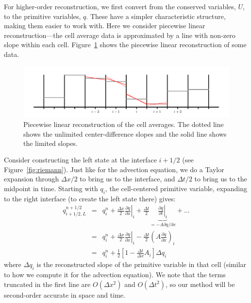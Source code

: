 \documentclass[11pt]{article}
\begin{document}
For higher-order reconstruction, we first convert from the conserved
variables, $U$, to the primitive variables, $q$.  These have a simpler
characteristic structure, making them easier to work with.  Here we
consider piecewise linear reconstruction---the cell average data is
approximated by a line with non-zero slope within each cell.
Figure~\ref{fig:plm} shows the piecewise linear reconstruction of some
data.

\begin{figure}[t]
\centering
\includegraphics[width=6.5in]{piecewise-linear}
\caption{\label{fig:plm} Piecewise linear reconstruction of the
cell averages.  The dotted line shows the unlimited center-difference
slopes and the solid line shows the limited slopes.}
\end{figure}

Consider constructing the left state at the interface $i+1/2$ (see
Figure~\ref{fig:riemann}).  Just like for the advection equation, we
do a Taylor expansion through $\Delta x/2$ to bring us to the
interface, and $\Delta t/2$ to bring us to the midpoint in time.
Starting with $q_i$, the cell-centered primitive variable, expanding
to the right interface (to create the left state there) gives:
\begin{eqnarray}
q_{i+1/2,L}^{n+1/2} &=& q_i^n + 
    \left . \frac{\Delta x}{2} \frac{\partial q}{\partial x} \right |_i +
    \frac{\Delta t}{2} \underbrace{\left .\frac{\partial q}{\partial t} \right |_i}_{= -A \partial q / \partial x} + \ldots \\
&=& q_i^n + \frac{\Delta x}{2} \left . \frac{\partial q}{\partial x} \right |_i
          - \frac{\Delta t}{2} \left ( A \frac{\partial q}{\partial x} \right )_i\\
&=& q_i^n + \frac{1}{2} \left [ 1 - \frac{\Delta t}{\Delta x} A_i \right ] \Delta q_i \label{eq:taylorstate}
\end{eqnarray}
where $\Delta q_i$ is the reconstructed slope of the primitive
variable in that cell (similar to how we compute it for the advection
equation).  We note that the terms truncated in the first line are
$O(\Delta x^2)$ and $O(\Delta t^2)$, so our method will be second-order
accurate in space and time.
\end{document}
